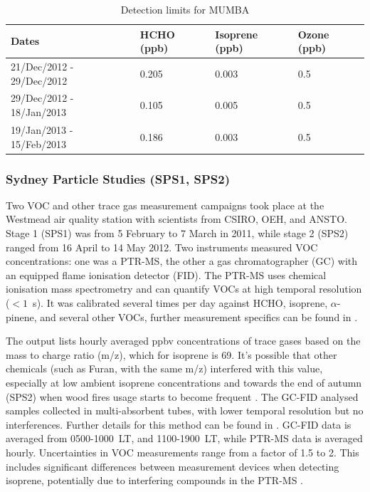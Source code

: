     \begin{table}
      \caption{Detection limits for MUMBA}
      \begin{tabular}{  l |  l  l  l }
        
        \textbf{Dates} & \textbf{HCHO (ppb)} & \textbf{Isoprene (ppb)} & \textbf{Ozone (ppb)}
        \\ \hline
        21/Dec/2012 - 29/Dec/2012 & 0.205 & 0.003 & 0.5 \\
        29/Dec/2012 - 18/Jan/2013 & 0.105 & 0.005 & 0.5 \\
        19/Jan/2013 - 15/Feb/2013 & 0.186 & 0.003 & 0.5 \\
      \end{tabular}
      \label{Model:Datasets:MUMBA:tab_detectionlimits}
    \end{table}
    
    \subsubsection{Sydney Particle Studies (SPS1, SPS2)}
    \label{Model:Datasets:SPS}
    Two VOC and other trace gas measurement campaigns took place at the Westmead air quality station with scientists from CSIRO, OEH, and ANSTO. 
    Stage 1 (SPS1) was from 5 February to 7 March in 2011, while stage 2 (SPS2) ranged from 16 April to 14 May 2012.
    Two instruments measured VOC concentrations: one was a PTR-MS, the other a gas chromatographer (GC) with an equipped flame ionisation detector (FID).
    The PTR-MS uses chemical ionisation mass spectrometry and can quantify VOCs at high temporal resolution ($< 1$~s).
    It was calibrated several times per day against HCHO, isoprene, $\alpha$-pinene, and several other VOCs, further measurement specifics can be found in \textcite{Dunne2012, Dunne2018}.
    
    The output lists hourly averaged ppbv concentrations of trace gases based on the mass to charge ratio (m/z), which for isoprene is 69.
    It's possible that other chemicals (such as Furan, with the same m/z) interfered with this value, especially at low ambient isoprene concentrations and towards the end of autumn (SPS2) when wood fires usage starts to become frequent \parencite{Guerette2018}.
    The GC-FID analysed samples collected in multi-absorbent tubes, with lower temporal resolution but no interferences. 
    Further details for this method can be found in \textcite{Cheng2016}.
    GC-FID data is averaged from 0500-1000~LT, and 1100-1900~LT, while PTR-MS data is averaged hourly.
    Uncertainties in VOC measurements range from a factor of 1.5 to 2.
    This includes significant differences between measurement devices when detecting isoprene, potentially due to interfering compounds in the PTR-MS \parencite{Dunne2018}.
    
